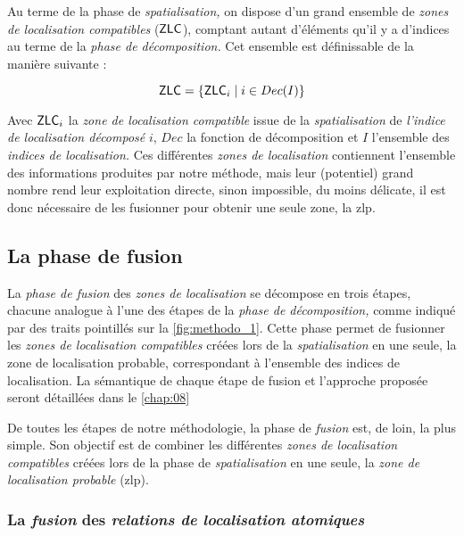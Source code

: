Au terme de la phase de \emph{spatialisation,} on dispose d'un grand
ensemble de \emph{zones de localisation compatibles}
(\(\text{\textsf{ZLC}}\)), comptant autant d'éléments qu'il y a
d'indices au terme de la \emph{phase de décomposition.} Cet ensemble
est définissable de la manière suivante :

\begin{equation}
  \text{\textsf{ZLC}} = \{\text{\textsf{ZLC}}_i \mid i \in Dec(I)\}
\end{equation}

Avec \(\text{\textsf{ZLC}}_i\) la \emph{zone de localisation
  compatible} issue de la \emph{spatialisation} de \emph{l'indice de
  localisation décomposé} \(i\), \(Dec\) la fonction de décomposition
et \(I\) l'ensemble des \emph{indices de localisation.} Ces
différentes \emph{zones de localisation} contiennent l'ensemble des
informations produites par notre méthode, mais leur (potentiel) grand
nombre rend leur exploitation directe, sinon impossible, du moins
délicate, il est donc nécessaire de les fusionner pour obtenir une
seule zone, la \ac{zlp}.

\subsection{La phase de fusion}

La \emph{phase de fusion} des \emph{zones de localisation} se
décompose en trois étapes, chacune analogue à l'une des étapes de la
\emph{phase de décomposition,} comme indiqué par des traits pointillés
sur la \autoref{fig:methodo_1}. Cette phase permet de fusionner les
\emph{zones de localisation compatibles} créées lors de la
\emph{spatialisation} en une seule, la zone de localisation probable,
correspondant à l'ensemble des indices de localisation. La sémantique
de chaque étape de fusion et l'approche proposée seront détaillées
dans le \autoref{chap:08}

De toutes les étapes de notre méthodologie, la phase de \emph{fusion}
est, de loin, la plus simple. Son objectif est de combiner les
différentes \emph{zones de localisation compatibles} créées lors de la
phase de \emph{spatialisation} en une seule, la \emph{zone de
  localisation probable} (\ac{zlp}).

\subsubsection{La \emph{fusion} des \emph{relations de localisation
    atomiques}}

